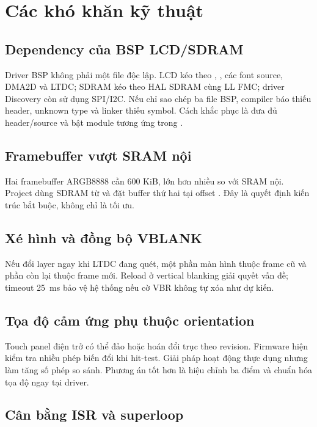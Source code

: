 \section{Các khó khăn kỹ thuật}

\subsection{Dependency của BSP LCD/SDRAM}

Driver BSP không phải một file độc lập. LCD kéo theo , , các font source, DMA2D và LTDC; SDRAM kéo theo HAL SDRAM cùng LL FMC; driver Discovery còn sử dụng SPI/I2C. Nếu chỉ sao chép ba file BSP, compiler báo thiếu header, unknown type và linker thiếu symbol. Cách khắc phục là đưa đủ header/source và bật module tương ứng trong .

\subsection{Framebuffer vượt SRAM nội}

Hai framebuffer ARGB8888 cần 600 KiB, lớn hơn nhiều so với SRAM nội. Project dùng SDRAM từ  và đặt buffer thứ hai tại offset . Đây là quyết định kiến trúc bắt buộc, không chỉ là tối ưu.

\subsection{Xé hình và đồng bộ VBLANK}

Nếu đổi layer ngay khi LTDC đang quét, một phần màn hình thuộc frame cũ và phần còn lại thuộc frame mới. Reload ở vertical blanking giải quyết vấn đề; timeout \SI{25}{\milli\second} bảo vệ hệ thống nếu cờ VBR không tự xóa như dự kiến.

\subsection{Tọa độ cảm ứng phụ thuộc orientation}

Touch panel điện trở có thể đảo hoặc hoán đổi trục theo revision. Firmware hiện kiểm tra nhiều phép biến đổi khi hit-test. Giải pháp hoạt động thực dụng nhưng làm tăng số phép so sánh. Phương án tốt hơn là hiệu chỉnh ba điểm và chuẩn hóa tọa độ ngay tại driver.

\subsection{Cân bằng ISR và superloop}

